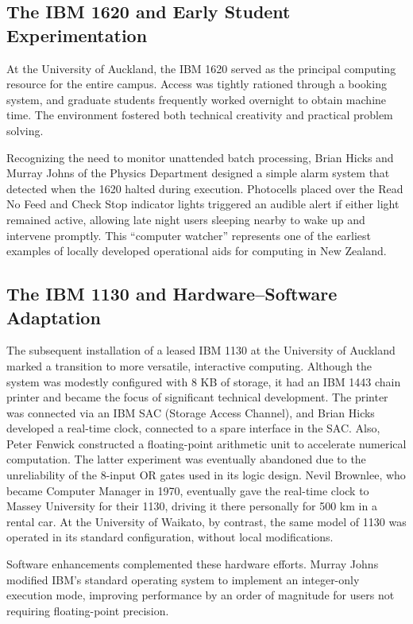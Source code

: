 \documentclass{IEEEcsmag}
\begin{document}
\subsection{The IBM 1620 and Early Student Experimentation}
\vspace*{5pt}
At the University of Auckland, the IBM 1620 served as the principal computing resource for the entire campus. Access was tightly rationed through a booking system, and graduate students frequently worked overnight to obtain machine time. The environment fostered both technical creativity and practical problem solving.

Recognizing the need to monitor unattended batch processing, Brian Hicks and Murray Johns of the Physics Department designed a simple alarm system that detected when the 1620 halted during execution. Photocells placed over the Read No Feed and Check Stop indicator lights triggered an audible alert if either light remained active, allowing late night users sleeping nearby to wake up and intervene promptly. This  “computer watcher” represents one of the earliest examples of locally developed operational aids for computing in New Zealand.

\subsection{The IBM 1130 and Hardware–Software Adaptation}
\vspace*{5pt}
The subsequent installation of a leased IBM 1130 at the University of Auckland marked a transition to more versatile, interactive computing. Although the system was modestly configured with 8 KB of storage, it had an IBM 1443 chain printer and became the focus of significant technical development. The printer was connected via an IBM SAC (Storage Access Channel), and
Brian Hicks developed a real-time clock, connected to a spare interface in the SAC. Also, Peter Fenwick constructed a floating-point arithmetic unit to accelerate numerical computation. The latter experiment was eventually abandoned due to the unreliability of the 8-input OR gates used in its logic design. Nevil Brownlee, who became Computer Manager in 1970, eventually gave the real-time clock to Massey University for their 1130, driving it there personally for 500 km in a rental car. At the University of Waikato, by contrast, the same model of 1130 was operated in its standard configuration, without local modifications.

Software enhancements complemented these hardware efforts. Murray Johns modified IBM’s standard operating system to implement an integer-only execution mode, improving performance by an order of magnitude for users not requiring floating-point precision.
\end{document}
